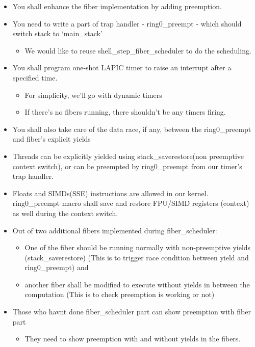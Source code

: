 \documentclass[]{article}
\providecommand{\tightlist}{%
  \setlength{\itemsep}{0pt}\setlength{\parskip}{0pt}}
\begin{document}
\begin{itemize}
\tightlist
\item
  You shall enhance the fiber implementation by adding preemption.
\item
  You need to write a part of trap handler - ring0\_preempt - which
  should switch stack to `main\_stack'

  \begin{itemize}
  \tightlist
  \item
    We would like to reuse shell\_step\_fiber\_scheduler to do the
    scheduling.
  \end{itemize}
\item
  You shall program one-shot LAPIC timer to raise an interrupt after a
  specified time.

  \begin{itemize}
  \tightlist
  \item
    For simplicity, we'll go with dynamic timers
  \item
    If there's no fibers running, there shouldn't be any timers firing.
  \end{itemize}
\item
  You shall also take care of the data race, if any, between the
  ring0\_preempt and fiber's explicit yields
\item
  Threads can be explicitly yielded using stack\_saverestore(non
  preemptive context switch), or can be preempted by ring0\_preempt from
  our timer's trap handler.
\item
  Floats and SIMDs(SSE) instructions are allowed in our kernel.
  ring0\_preempt macro shall save and restore FPU/SIMD registers
  (context) as well during the context switch.
\item
  Out of two additional fibers implemented during fiber\_scheduler:

  \begin{itemize}
  \tightlist
  \item
    One of the fiber should be running normally with non-preemptive
    yields (stack\_saverestore) (This is to trigger race condition
    between yield and ring0\_preempt) and
  \item
    another fiber shall be modified to execute without yields in between
    the computation (This is to check preemption is working or not)
  \end{itemize}
\item
  Those who havnt done fiber\_scheduler part can show preemption with
  fiber part

  \begin{itemize}
  \tightlist
  \item
    They need to show preemption with and without yields in the fibers.
  \end{itemize}
\end{itemize}
\end{document}
